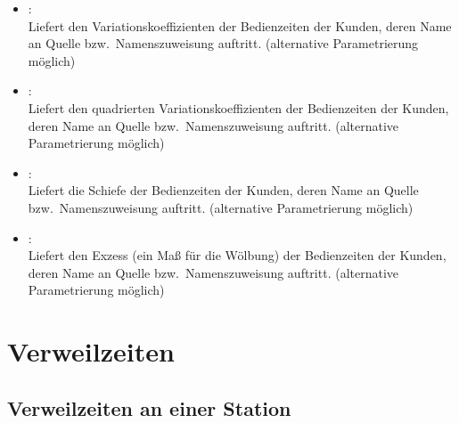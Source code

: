 \begin{itemize}
\item
{}:\\
Liefert den Variationskoeffizienten der Bedienzeiten der Kunden, deren Name an Quelle bzw.\ Namenszuweisung  auftritt.
(alternative Parametrierung möglich)

\item
{}:\\
Liefert den quadrierten Variationskoeffizienten der Bedienzeiten der Kunden, deren Name an Quelle bzw.\ Namenszuweisung  auftritt.
(alternative Parametrierung möglich)

\item
{}:\\
Liefert die Schiefe der Bedienzeiten der Kunden, deren Name an Quelle bzw.\ Namenszuweisung  auftritt.
(alternative Parametrierung möglich)

\item
{}:\\
Liefert den Exzess (ein Maß für die Wölbung) der Bedienzeiten der Kunden, deren Name an Quelle bzw.\ Namenszuweisung  auftritt.
(alternative Parametrierung möglich)

\end{itemize}



\section{Verweilzeiten}



\subsection{Verweilzeiten an einer Station}


